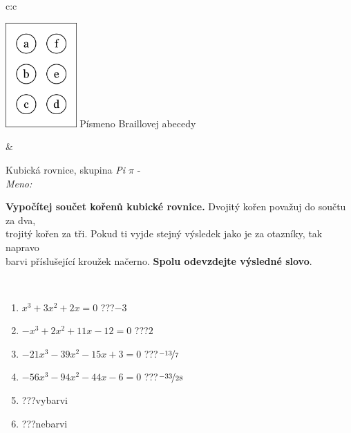 \documentclass[10pt]{report}
\begin{document}
\begin{tabular}{c:c}
\begin{minipage}[c][104.5mm][t]{0.5\linewidth}
\begin{center}
\begin{minipage}{0.20\linewidth}
\begin{center}
\includegraphics[height=40mm]{../images/braille.png}
{\small Písmeno Braillovej abecedy}
\end{center}
\end{minipage}
\end{center}
\end{minipage}
&
\begin{minipage}[c][104.5mm][t]{0.5\linewidth}
\begin{center}
\vspace{7mm}
{\huge Kubická rovnice, skupina \textit{Pi $\pi$} -}\\[5mm]
\textit{Meno:}\phantom{xxxxxxxxxxxxxxxxxxxxxxxxxxxxxxxxxxxxxxxxxxxxxxxxxxxxxxxxxxxxxxxxx}\\[5mm]
\begin{minipage}{0.95\linewidth}
\textbf{Vypočítej součet kořenů kubické rovnice.} Dvojitý kořen považuj do součtu za dva,\\trojitý kořen za tři. Pokud ti vyjde stejný výsledek jako je za otazníky, tak napravo\\barvi příslušející kroužek načerno. \textbf{Spolu odevzdejte výsledné slovo}.
\end{minipage}
\\[1mm]
\begin{minipage}{0.79\linewidth}
\begin{center}
\begin{varwidth}{\linewidth}
\begin{enumerate}
\Large
\item $x^3+3x^2+2x=0$\quad \dotfill\; ???\;\dotfill \quad $-3$
\item $-x^3+2x^2+11x-12=0$\quad \dotfill\; ???\;\dotfill \quad $2$
\item $-21x^3-39x^2-15x+3=0$\quad \dotfill\; ???\;\dotfill \quad $\nicefrac{-13}{7}$
\item $-56x^3-94x^2-44x-6=0$\quad \dotfill\; ???\;\dotfill \quad $\nicefrac{-33}{28}$
\item \quad \dotfill\; ???\;\dotfill \quad vybarvi
\item \quad \dotfill\; ???\;\dotfill \quad nebarvi
\end{enumerate}

\end{varwidth}
\end{center}
\end{minipage}
\end{center}
\end{minipage}
\end{tabular}
\end{document}
